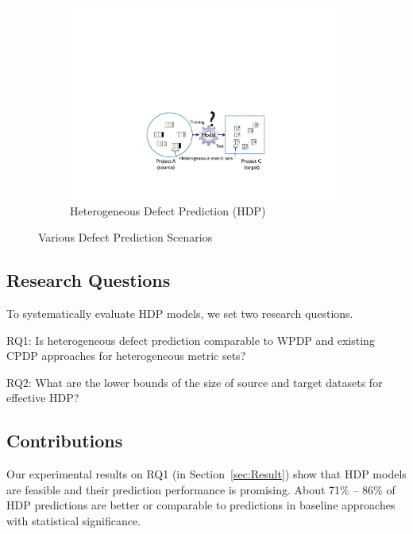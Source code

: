 \begin{figure}[t]
 \begin{subfigure}{0.8\linewidth}
 	\includegraphics[scale=0.5]{Figures/intro/p_crossdomain.pdf}
  	\caption{Heterogeneous Defect Prediction \tiny{(HDP)}}
   	\label{fig:subfig3}
 \end{subfigure}
 
 \label{fig:type_of_predictions}
 \caption{%
  Various Defect Prediction Scenarios
  }
\end{figure}

\subsection{Research Questions}
To systematically evaluate HDP models, we set
two research questions.
\squishlist
  \item RQ1: Is heterogeneous defect prediction comparable to WPDP and existing CPDP approaches for heterogeneous metric sets?
   \item RQ2: What are the  lower  bounds  of  the  size  of source and target  datasets  for  effective HDP?
\squishend
% 

\subsection{Contributions}
Our experimental results on RQ1 (in Section~\ref{sec:Result}) show that HDP models are feasible and their prediction
performance is promising. About 71\% -- 86\% of HDP predictions
are better or comparable to predictions in baseline approaches with statistical
significance.
 
